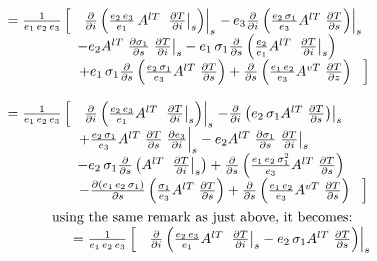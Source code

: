 \documentclass[../main/NEMO_manual]{subfiles}
\begin{document}
\begin{align*}
{\begin{array}{*{20}l}
    & =\frac{1}{e_1\,e_2\,e_3 }\left[ {\left. {\;\;\;\frac{\partial }{\partial i}\left( {\frac{e_2\,e_3 }{e_1}\,A^{lT}\;\left. {\frac{\partial T}{\partial i}} \right|_s } \right)} \right|_s \left. -\, {e_3 \frac{\partial }{\partial i}\left( {\frac{e_2 \,\sigma_1 }{e_3 }A^{lT}\;\frac{\partial T}{\partial s}} \right)} \right|_s } \right. \\
    & \qquad \qquad \quad -e_2 A^{lT}\;\frac{\partial \sigma_1 }{\partial s}\left. {\frac{\partial T}{\partial i}} \right|_s -e_1 \,\sigma_1 \frac{\partial }{\partial s}\left( {\frac{e_2 }{e_1 }A^{lT}\;\left. {\frac{\partial T}{\partial i}} \right|_s } \right) \\
    & \qquad \qquad \quad\shoveright{ \left. { +e_1 \,\sigma_1 \frac{\partial }{\partial s}\left( {\frac{e_2 \,\sigma_1 }{e_3 }A^{lT}\;\frac{\partial T}{\partial s}} \right)+\frac{\partial }{\partial s}\left( {\frac{e_1 \,e_2 }{e_3 }A^{vT}\;\frac{\partial T}{\partial z}} \right)\;\;\;} \right] }\\
    \\
    &=\frac{1}{e_1 \,e_2 \,e_3 } \left[ {\left. {\;\;\;\frac{\partial }{\partial i} \left( {\frac{e_2 \,e_3 }{e_1 }A^{lT}\;\left. {\frac{\partial T}{\partial i}} \right|_s } \right)} \right|_s \left. {-\frac{\partial }{\partial i}\left( {e_2 \,\sigma_1 A^{lT}\;\frac{\partial T}{\partial s}} \right)} \right|_s } \right. \\
    & \qquad \qquad \quad \left. {+\frac{e_2 \,\sigma_1 }{e_3}A^{lT}\;\frac{\partial T}{\partial s} \;\frac{\partial e_3 }{\partial i}}  \right|_s -e_2 A^{lT}\;\frac{\partial \sigma_1 }{\partial s}\left. {\frac{\partial T}{\partial i}} \right|_s \\
    & \qquad \qquad \quad-e_2 \,\sigma_1 \frac{\partial}{\partial s}\left( {A^{lT}\;\left. {\frac{\partial T}{\partial i}} \right|_s } \right)+\frac{\partial }{\partial s}\left( {\frac{e_1 \,e_2 \,\sigma_1 ^2}{e_3 }A^{lT}\;\frac{\partial T}{\partial s}} \right) \\
    & \qquad \qquad \quad\shoveright{ \left. {-\frac{\partial \left( {e_1 \,e_2 \,\sigma_1 } \right)}{\partial s} \left( {\frac{\sigma_1 }{e_3}A^{lT}\;\frac{\partial T}{\partial s}} \right) + \frac{\partial }{\partial s}\left( {\frac{e_1 \,e_2 }{e_3 }A^{vT}\;\frac{\partial T}{\partial s}} \right)\;\;\;} \right]}
  \end{array}
      } \\
  {
  \begin{array}{*{20}l}
    \intertext{using the same remark as just above, it becomes:}
    &= \frac{1}{e_1 \,e_2 \,e_3 } \left[ {\left. {\;\;\;\frac{\partial }{\partial i} \left( {\frac{e_2 \,e_3 }{e_1 }A^{lT}\;\left. {\frac{\partial T}{\partial i}} \right|_s -e_2 \,\sigma_1 A^{lT}\;\frac{\partial T}{\partial s}} \right)} \right|_s } \right.\;\;\; \\

\end{array}}
\end{align*}
\end{document}

